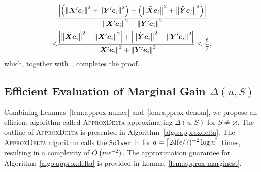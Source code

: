 \documentclass[10pt,twocolumn,twoside]{IEEEtran}
\begin{document}
\begin{IEEEproof}
    \begin{align*}
            & \frac{\left|\left( \left\Vert\boldsymbol{X}'\boldsymbol{e}_i\right\Vert^2+\left\Vert\boldsymbol{Y}'\boldsymbol{e}_i\right\Vert^2 \right)-\left( \left\Vert\tilde{\boldsymbol{X}}\boldsymbol{e}_i\right\Vert^2+\left\Vert\tilde{\boldsymbol{Y}}\boldsymbol{e}_i\right\Vert^2 \right) \right|}{\left\Vert\boldsymbol{X}'\boldsymbol{e}_i\right\Vert^2+\left\Vert\boldsymbol{Y}'\boldsymbol{e}_i\right\Vert^2}             \\
        \le & \frac{\left|\left\Vert\tilde{\boldsymbol{X}}\boldsymbol{e}_i\right\Vert^2-\left\Vert\boldsymbol{X}'\boldsymbol{e}_i\right\Vert^2 \right|+\left|\left\Vert\tilde{\boldsymbol{Y}}\boldsymbol{e}_i\right\Vert^2-\left\Vert\boldsymbol{Y}'\boldsymbol{e}_i\right\Vert^2 \right|}{\left\Vert\boldsymbol{X}'\boldsymbol{e}_i\right\Vert^2+\left\Vert\boldsymbol{Y}'\boldsymbol{e}_i\right\Vert^2}\le\frac{\epsilon}{7},
    \end{align*}
    which, together with~, completes the proof.
\end{IEEEproof}



\subsection{Efficient Evaluation of Marginal Gain \(\Delta(u,S)\)}

Combining Lemmas~\ref{lem:approx-numer} and~\ref{lem:approx-denom}, we propose an efficient algorithm called \textsc{ApproxDelta} approximating \(\Delta(u,S)\) for  \(S\neq\varnothing\). The outline of  \textsc{ApproxDelta} is presented in Algorithm~\ref{algo:approxdelta}. The \textsc{ApproxDelta} algorithm calls the \(\mathtt{Solver}\) in  for \(q=\left\lceil24(\epsilon/7)^{-2}\log n\right\rceil\) times, resulting in a complexity of \(\tilde{O}\left( m\epsilon^{-2} \right)\). The approximation guarantee for Algorithm~\ref{algo:approxdelta} is provided in
Lemma~\ref{lem:approx-marginest}.
\end{document}
